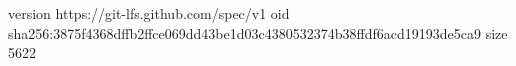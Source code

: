 version https://git-lfs.github.com/spec/v1
oid sha256:3875f4368dffb2ffce069dd43be1d03c4380532374b38ffdf6acd19193de5ca9
size 5622
